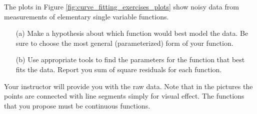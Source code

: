 % 
% 
% 


\begin{problem}\label{prob:curve_fitting_exercises}
    The plots in Figure \ref{fig:curve_fitting_exercises_plots} show noisy data from
    measurements of elementary single variable functions.
    \begin{enumerate}
        \item[(a)] Make a hypothesis about which function would best model the data.  Be
            sure to choose the most general (parameterized) form of your function.
        \item[(b)] Use appropriate tools to find the parameters for the function that best
            fits the data.  Report you sum of square residuals for each function.
    \end{enumerate}
    Your instructor will provide you with the raw data.  Note that in the pictures the
    points are connected with line segments simply for visual effect.  The functions that
    you propose must be continuous functions.
\end{problem}


